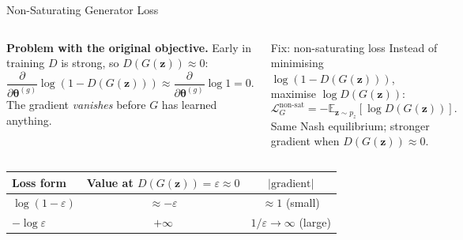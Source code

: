 \documentclass[aspectratio=169,11pt]{beamer}
\newcommand{\E}{\mathbb{E}}
\newcommand{\bz}{\bm{z}}
\newcommand{\btheta}{\bm{\theta}}
\newcommand{\pz}{p_{z}}           %
\begin{document}
\begin{frame}{Non-Saturating Generator Loss}
  \begin{columns}[T]
      \textbf{Problem with the original objective.}
      Early in training $D$ is strong, so $D(G(\bz))\approx 0$:
      \[
        \frac{\partial}{\partial\btheta^{(g)}}\log(1-D(G(\bz)))
        \approx \frac{\partial}{\partial\btheta^{(g)}}\log 1 = 0.
      \]
      The gradient \emph{vanishes} before $G$ has learned anything.

      \begin{alertblock}{Fix: non-saturating loss}
        Instead of minimising $\log(1-D(G(\bz)))$,\\
        maximise $\log D(G(\bz))$:
        \[
          \mathcal{L}_G^{\text{non-sat}}
          = -\E_{\bz\sim\pz}[\log D(G(\bz))].
        \]
        Same Nash equilibrium; stronger gradient when $D(G(\bz))\approx 0$.
      \end{alertblock}
  \end{columns}

  \medskip
  \begin{center}
  \renewcommand{\arraystretch}{1.2}
  \begin{tabular}{lcc}
    \toprule
    Loss form & Value at $D(G(\bz))=\varepsilon\approx0$
              & $|\text{gradient}|$\\
    \midrule
    $\log(1-\varepsilon)$ & $\approx-\varepsilon$ & $\approx 1$ (small)\\
    $-\log\varepsilon$    & $+\infty$             & $1/\varepsilon\to\infty$ (large)\\
    \bottomrule
  \end{tabular}
  \end{center}
\end{frame}
\end{document}
